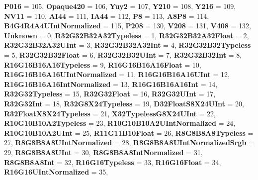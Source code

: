 \begin{DoxyCompactItemize}
\newline
{\bfseries P016} = 105, 
{\bfseries Opaque420} = 106, 
{\bfseries Yuy2} = 107, 
{\bfseries Y210} = 108, 
\newline
{\bfseries Y216} = 109, 
{\bfseries N\+V11} = 110, 
{\bfseries A\+I44} = 111, 
{\bfseries I\+A44} = 112, 
\newline
{\bfseries P8} = 113, 
{\bfseries A8\+P8} = 114, 
{\bfseries B4\+G4\+R4\+A4\+U\+Int\+Normalized} = 115, 
{\bfseries P208} = 130, 
\newline
{\bfseries V208} = 131, 
{\bfseries V408} = 132, 
{\bfseries Unknown} = 0, 
{\bfseries R32\+G32\+B32\+A32\+Typeless} = 1, 
\newline
{\bfseries R32\+G32\+B32\+A32\+Float} = 2, 
{\bfseries R32\+G32\+B32\+A32\+U\+Int} = 3, 
{\bfseries R32\+G32\+B32\+A32\+Int} = 4, 
{\bfseries R32\+G32\+B32\+Typeless} = 5, 
\newline
{\bfseries R32\+G32\+B32\+Float} = 6, 
{\bfseries R32\+G32\+B32\+U\+Int} = 7, 
{\bfseries R32\+G32\+B32\+Int} = 8, 
{\bfseries R16\+G16\+B16\+A16\+Typeless} = 9, 
\newline
{\bfseries R16\+G16\+B16\+A16\+Float} = 10, 
{\bfseries R16\+G16\+B16\+A16\+U\+Int\+Normalized} = 11, 
{\bfseries R16\+G16\+B16\+A16\+U\+Int} = 12, 
{\bfseries R16\+G16\+B16\+A16\+Int\+Normalized} = 13, 
\newline
{\bfseries R16\+G16\+B16\+A16\+Int} = 14, 
{\bfseries R32\+G32\+Typeless} = 15, 
{\bfseries R32\+G32\+Float} = 16, 
{\bfseries R32\+G32\+U\+Int} = 17, 
\newline
{\bfseries R32\+G32\+Int} = 18, 
{\bfseries R32\+G8\+X24\+Typeless} = 19, 
{\bfseries D32\+Float\+S8\+X24\+U\+Int} = 20, 
{\bfseries R32\+Float\+X8\+X24\+Typeless} = 21, 
\newline
{\bfseries X32\+Typeless\+G8\+X24\+U\+Int} = 22, 
{\bfseries R10\+G10\+B10\+A2\+Typeless} = 23, 
{\bfseries R10\+G10\+B10\+A2\+U\+Int\+Normalized} = 24, 
{\bfseries R10\+G10\+B10\+A2\+U\+Int} = 25, 
\newline
{\bfseries R11\+G11\+B10\+Float} = 26, 
{\bfseries R8\+G8\+B8\+A8\+Typeless} = 27, 
{\bfseries R8\+G8\+B8\+A8\+U\+Int\+Normalized} = 28, 
{\bfseries R8\+G8\+B8\+A8\+U\+Int\+Normalized\+Srgb} = 29, 
\newline
{\bfseries R8\+G8\+B8\+A8\+U\+Int} = 30, 
{\bfseries R8\+G8\+B8\+A8\+Int\+Normalized} = 31, 
{\bfseries R8\+G8\+B8\+A8\+Int} = 32, 
{\bfseries R16\+G16\+Typeless} = 33, 
\newline
{\bfseries R16\+G16\+Float} = 34, 
{\bfseries R16\+G16\+U\+Int\+Normalized} = 35, 

\end{DoxyCompactItemize}
